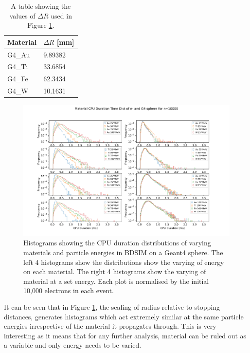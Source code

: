 \documentclass[12pt,a4paper]{article}
\begin{document}
\begin{table}[h!]
\centering
\begin{tabular}{|l|l|}
\hline
Material & $\Delta R$ [mm] \\ \hline
G4\_Au &  9.89382\\ \hline
G4\_Ti &  33.6854\\ \hline
G4\_Fe &  62.3434\\ \hline
G4\_W &  10.1631\\ \hline
\end{tabular}
\caption{A table showing the values of $\Delta R$ used in Figure \ref{var}.}
\label{rs}
\end{table}

\begin{figure}[h!]
\centering
\includegraphics[scale=0.6]{Images//Materials//Varied_by_radius_and_secondaries.pdf}
\caption[width=\columnwidth]{Histograms showing the CPU duration distributions of varying materials and particle energies in BDSIM on a Geant4 sphere. The left 4 histograms show the distributions show the varying of energy on each material. The right 4 histograms show the varying of material at a set energy. Each plot is normalised by the initial 10,000 electrons in each event.}
\label{var}
\end{figure}

\noindent It can be seen that in Figure \ref{var}, the scaling of radius relative to stopping distances, generates histograms which act extremely similar at the same particle energies irrespective of the material it propagates through. This is very interesting as it means that for any further analysis, material can be ruled out as a variable and only energy needs to be varied.
\end{document}
